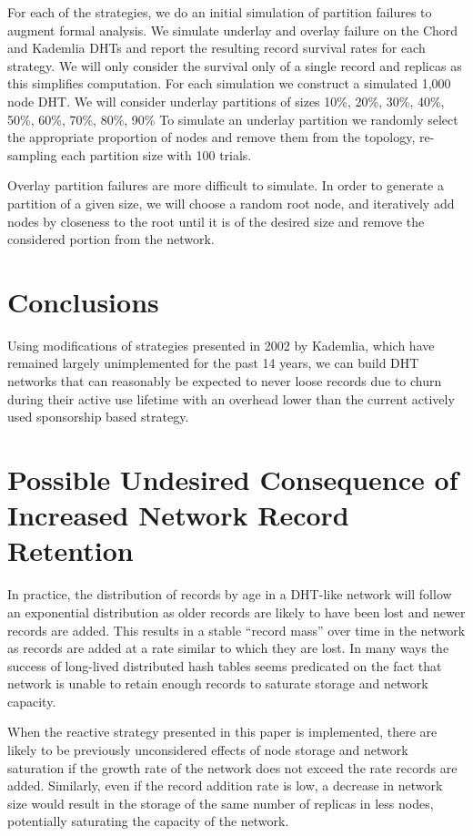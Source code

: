 	For each of the strategies, we do an initial simulation of partition failures to augment formal analysis.
	We simulate underlay and overlay failure on the Chord and Kademlia DHTs and report the resulting record survival rates for each strategy.
	We will only consider the survival only of a single record and replicas as this simplifies computation. 
	For each simulation we construct a simulated 1,000 node DHT.
	We will consider underlay partitions of sizes 10\%, 20\%, 30\%, 40\%, 50\%, 60\%, 70\%, 80\%, 90\%
	To simulate an underlay partition we randomly select the appropriate proportion of nodes and remove them from the topology, re-sampling each partition size with 100 trials.
	
	Overlay partition failures are more difficult to simulate.
	In order to generate a partition of a given size, we will choose a random root node, and iteratively add nodes by closeness to the root until it is of the desired size and remove the considered portion from the network. 
	
	
	
	\section{Conclusions}
	
	Using modifications of strategies presented in 2002 by Kademlia\cite{kademlia}, which have remained largely unimplemented for the past 14 years, we can build DHT networks that can reasonably be expected to never loose records due to churn during their active use lifetime with an overhead lower than the current actively used sponsorship based strategy.
	
	\section{Possible Undesired Consequence of Increased Network Record Retention}
	
	In practice, the distribution of records by age in a DHT-like network will follow an exponential distribution as older records are likely to have been lost and newer records are added.
	This results in a stable ``record mass'' over time in the network as records are added at a rate similar to which they are lost.
	In many ways the success of long-lived distributed hash tables seems predicated on the fact that network is unable to retain enough records to saturate storage and network capacity.
	
	When the reactive strategy presented in this paper is implemented, there are likely to be previously unconsidered effects of node storage and network saturation if the growth rate of the network does not exceed the rate records are added.
	Similarly, even if the record addition rate is low, a decrease in network size would result in the storage of the same number of replicas in less nodes, potentially saturating the capacity of the network.
	
	
